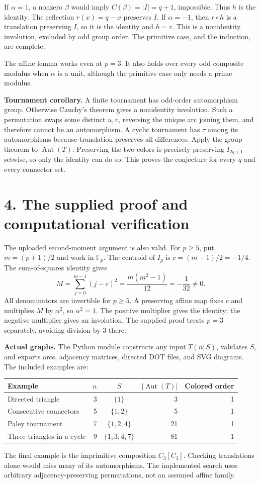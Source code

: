 \documentclass[11pt]{article}
\newcommand{\F}{\mathbb F}
\newcommand{\Aut}{\operatorname{Aut}}
\begin{document}
If $\alpha=1$, a nonzero $\beta$ would imply
$C(\beta)=|I|=q+1$, impossible. Thus $h$ is the identity.
The reflection $r(x)=q-x$ preserves $I$.
If $\alpha=-1$, then $r\circ h$ is a translation preserving $I$,
so it is the identity and $h=r$. This is a nonidentity involution,
excluded by odd group order. The primitive case, and the induction,
are complete.

The affine lemma works even at $p=3$. It also holds over every odd
composite modulus when $\alpha$ is a unit, although the primitive
case only needs a prime modulus.

\textbf{Tournament corollary.} A finite tournament has odd-order
automorphism group. Otherwise Cauchy's theorem gives a nonidentity
involution. Such a permutation swaps some distinct $u,v$, reversing
the unique arc joining them, and therefore cannot be an automorphism.
A cyclic tournament has $\tau$ among its automorphisms because
translation preserves all differences. Apply the group theorem to
$\Aut(T)$. Preserving the two colors is precisely preserving
$I_{2q+1}$ setwise, so only the identity can do so.
This proves the conjecture for every $q$ and every connector set.

\newpage
\section*{4. The supplied proof and computational verification}
The uploaded second-moment argument is also valid. For $p\geq5$,
put $m=(p+1)/2$ and work in $\F_p$. The centroid of $I_p$ is
$c=(m-1)/2=-1/4$. The sum-of-squares identity gives
\[
 M=\sum_{j=0}^{m-1}(j-c)^2
   =\frac{m(m^2-1)}{12}
   =-\frac1{32}\neq0.
\]
All denominators are invertible for $p\geq5$. A preserving affine
map fixes $c$ and multiplies $M$ by $\alpha^2$, so $\alpha^2=1$.
The positive multiplier gives the identity; the negative multiplier
gives an involution. The supplied proof treats $p=3$ separately,
avoiding division by $3$ there.

\textbf{Actual graphs.} The Python module constructs any input
$T(n;S)$, validates $S$, and exports arcs, adjacency matrices,
directed DOT files, and SVG diagrams. The included examples are:
\begin{center}
\begin{tabular}{@{}lrcrr@{}}
\toprule
Example & $n$ & $S$ & $|\Aut(T)|$ & Colored order\\
\midrule
Directed triangle & 3 & $\{1\}$ & 3 & 1\\
Consecutive connectors & 5 & $\{1,2\}$ & 5 & 1\\
Paley tournament & 7 & $\{1,2,4\}$ & 21 & 1\\
Three triangles in a cycle & 9 & $\{1,3,4,7\}$ & 81 & 1\\
\bottomrule
\end{tabular}
\end{center}
The final example is the imprimitive composition $C_3[C_3]$.
Checking translations alone would miss many of its automorphisms.
The implemented search uses arbitrary adjacency-preserving
permutations, not an assumed affine family.
\end{document}
